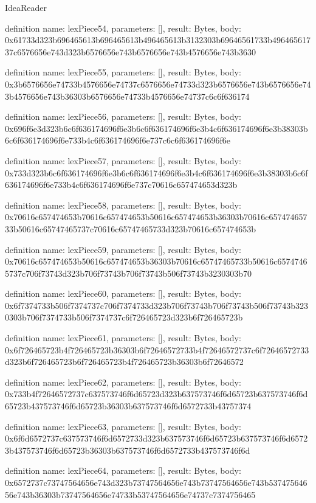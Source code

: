 \begin{lexlean}{IdeaReader}
\begin{semanticmodule}
definition{
  name: lexPiece54,
  parameters: [],
  result: Bytes,
  body: 0x61733d323b696465613b696465613b496465613b3132303b69646561733b49646561737c6576656e743d323b6576656e743b6576656e743b4576656e743b3630
}

definition{
  name: lexPiece55,
  parameters: [],
  result: Bytes,
  body: 0x3b6576656e74733b4576656e74737c6576656e74733d323b6576656e743b6576656e743b4576656e743b36303b6576656e74733b4576656e74737c6c6f636174
}

definition{
  name: lexPiece56,
  parameters: [],
  result: Bytes,
  body: 0x696f6e3d323b6c6f636174696f6e3b6c6f636174696f6e3b4c6f636174696f6e3b38303b6c6f636174696f6e733b4c6f636174696f6e737c6c6f636174696f6e
}

definition{
  name: lexPiece57,
  parameters: [],
  result: Bytes,
  body: 0x733d323b6c6f636174696f6e3b6c6f636174696f6e3b4c6f636174696f6e3b38303b6c6f636174696f6e733b4c6f636174696f6e737c70616c657474653d323b
}

definition{
  name: lexPiece58,
  parameters: [],
  result: Bytes,
  body: 0x70616c657474653b70616c657474653b50616c657474653b36303b70616c65747465733b50616c65747465737c70616c65747465733d323b70616c657474653b
}

definition{
  name: lexPiece59,
  parameters: [],
  result: Bytes,
  body: 0x70616c657474653b50616c657474653b36303b70616c65747465733b50616c65747465737c706f73743d323b706f73743b706f73743b506f73743b3230303b70
}

definition{
  name: lexPiece60,
  parameters: [],
  result: Bytes,
  body: 0x6f7374733b506f7374737c706f7374733d323b706f73743b706f73743b506f73743b3230303b706f7374733b506f7374737c6f726465723d323b6f726465723b
}

definition{
  name: lexPiece61,
  parameters: [],
  result: Bytes,
  body: 0x6f726465723b4f726465723b36303b6f72646572733b4f72646572737c6f72646572733d323b6f726465723b6f726465723b4f726465723b36303b6f72646572
}

definition{
  name: lexPiece62,
  parameters: [],
  result: Bytes,
  body: 0x733b4f72646572737c637573746f6d65723d323b637573746f6d65723b637573746f6d65723b437573746f6d65723b36303b637573746f6d6572733b43757374
}

definition{
  name: lexPiece63,
  parameters: [],
  result: Bytes,
  body: 0x6f6d6572737c637573746f6d6572733d323b637573746f6d65723b637573746f6d65723b437573746f6d65723b36303b637573746f6d6572733b437573746f6d
}

definition{
  name: lexPiece64,
  parameters: [],
  result: Bytes,
  body: 0x6572737c73747564656e743d323b73747564656e743b73747564656e743b53747564656e743b36303b73747564656e74733b53747564656e74737c7374756465
}


\end{semanticmodule}
\end{lexlean}
